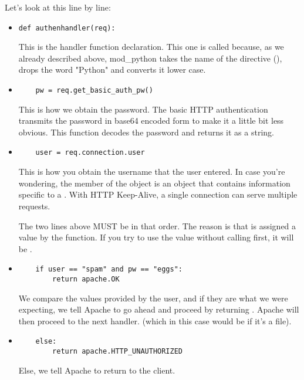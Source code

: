 Let's look at this line by line: 

\begin{itemize}

\item
\begin{verbatim}
def authenhandler(req):
\end{verbatim}

This is the handler function declaration. This one is called
 because, as we already described above, mod_python takes
the name of the directive (), drops the word
"Python" and converts it lower case.

\item
\begin{verbatim}
    pw = req.get_basic_auth_pw()
\end{verbatim}
                  
This is how we obtain the password. The basic HTTP authentication
transmits the password in base64 encoded form to make it a little bit
less obvious. This function decodes the password and returns it as a
string.

\item
\begin{verbatim}
    user = req.connection.user
\end{verbatim}
                  
This is how you obtain the username that the user entered. In case
you're wondering, the  member of the 
object is an object that contains information specific to a
. With HTTP Keep-Alive, a single connection
can serve multiple requests.

 The two lines above MUST be in that order. The reason is that
 is assigned a value by the 
function. If you try to use the  value without calling
 first, it will be .

\item
\begin{verbatim}
    if user == "spam" and pw == "eggs":
        return apache.OK
\end{verbatim}

We compare the values provided by the user, and if they are what we
were expecting, we tell Apache to go ahead and proceed by returning
. Apache will then proceed to the next handler. (which in
this case would be  if it's a  file).

\item
\begin{verbatim}
    else:
        return apache.HTTP_UNAUTHORIZED 
\end{verbatim}

Else, we tell Apache to return  to the client. 

\end{itemize}

